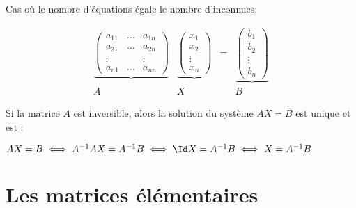 \begin{frame}

Cas où le nombre d'équations égale le nombre d'inconnues:

\begin{equation*}\begin{array}{cccc}
\underbrace{
\left(
\begin{array}{ccc}
a_{11} & \dots & a_{1n}\\
a_{21} & \dots & a_{2n}\\
\vdots &&\vdots\\
a_{n1} &\dots & a_{nn}
\end{array}
\right)
}
&
\underbrace{
\left(
\begin{array}{c}
x_1\\
x_2\\
\vdots\\
x_n
\end{array}
\right)
}
& = &
\underbrace{
\left(
\begin{array}{c}
b_1\\
b_2\\
\vdots\\
b_n
\end{array}
\right)
} 
\\
A & X & & B
\end{array}\end{equation*}

\pause

\begin{proposition}
Si la matrice $A$ est inversible, alors
la solution du système $AX=B$ est unique et est :
\end{proposition}

\pause

$AX= B \iff A^{-1}AX = A^{-1}B \iff \Id X = A^{-1}B\iff X = A^{-1}B$


\end{frame}




\section{Les matrices élémentaires}

